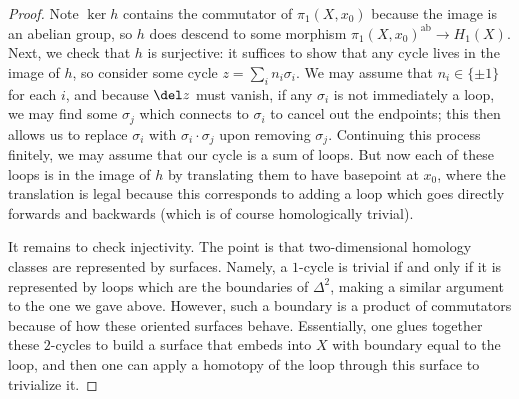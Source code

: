 \documentclass[../notes.tex]{subfiles}
\begin{document}
\begin{proof}
	Note $\ker h$ contains the commutator of $\pi_1(X,x_0)$ because the image is an abelian group, so $h$ does descend to some morphism $\pi_1(X,x_0)^{\mathrm{ab}}\to H_1(X)$. Next, we check that $h$ is surjective: it suffices to show that any cycle lives in the image of $h$, so consider some cycle $z=\sum_in_i\sigma_i$. We may assume that $n_i\in\{\pm1\}$ for each $i$, and because $\del z$ must vanish, if any $\sigma_i$ is not immediately a loop, we may find some $\sigma_j$ which connects to $\sigma_i$ to cancel out the endpoints; this then allows us to replace $\sigma_i$ with $\sigma_i\cdot\sigma_j$ upon removing $\sigma_j$. Continuing this process finitely, we may assume that our cycle is a sum of loops. But now each of these loops is in the image of $h$ by translating them to have basepoint at $x_0$, where the translation is legal because this corresponds to adding a loop which goes directly forwards and backwards (which is of course homologically trivial).

	It remains to check injectivity. The point is that two-dimensional homology classes are represented by surfaces. Namely, a $1$-cycle is trivial if and only if it is represented by loops which are the boundaries of $\Delta^2$, making a similar argument to the one we gave above. However, such a boundary is a product of commutators because of how these oriented surfaces behave. Essentially, one glues together these $2$-cycles to build a surface that embeds into $X$ with boundary equal to the loop, and then one can apply a homotopy of the loop through this surface to trivialize it.
\end{proof}
\end{document}
